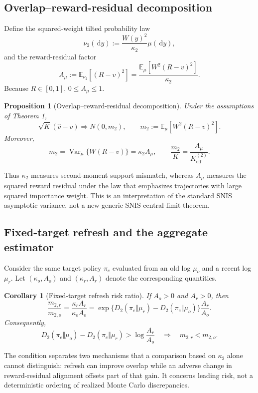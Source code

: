 \documentclass[10pt]{article}
\newtheorem{proposition}{Proposition}
\newtheorem{corollary}{Corollary}
\theoremstyle{remark}
\newcommand{\E}{\mathbb{E}}
\newcommand{\Var}{\operatorname{Var}}
\newcommand{\dd}{\,\mathrm{d}}
\begin{document}
\subsection{Overlap--reward-residual decomposition}
Define the squared-weight tilted probability law
\begin{equation}
\nu_2(\dd y):=\frac{W(y)^2}{\kappa_2}\mu(\dd y),
\end{equation}
and the reward-residual factor
\begin{equation}
A_\mu:=\E_{\nu_2}[(R-v)^2]=\frac{\E_\mu[W^2(R-v)^2]}{\kappa_2}.
\end{equation}
Because $R\in[0,1]$, $0\le A_\mu\le1$.

\begin{proposition}[Overlap--reward-residual decomposition]
Under the assumptions of Theorem 1,
\begin{equation}
\sqrt K(\widehat v-v)\Rightarrow N(0,m_2),\qquad m_2:=\E_\mu[W^2(R-v)^2].
\end{equation}
Moreover,
\begin{equation}
m_2=\Var_\mu\{W(R-v)\}=\kappa_2A_\mu,\qquad \frac{m_2}{K}=\frac{A_\mu}{K_{\mathrm{eff}}^{(2)}}.
\end{equation}
\end{proposition}
Thus $\kappa_2$ measures second-moment support mismatch, whereas $A_\mu$ measures the squared reward residual under the law that emphasizes trajectories with large squared importance weight. This is an interpretation of the standard SNIS asymptotic variance, not a new generic SNIS central-limit theorem.

\subsection{Fixed-target refresh and the aggregate estimator}
Consider the same target policy $\pi_e$ evaluated from an old log $\mu_o$ and a recent log $\mu_r$. Let $(\kappa_o,A_o)$ and $(\kappa_r,A_r)$ denote the corresponding quantities.

\begin{corollary}[Fixed-target refresh risk ratio]
If $A_o>0$ and $A_r>0$, then
\begin{equation}
\frac{m_{2,r}}{m_{2,o}}=\frac{\kappa_rA_r}{\kappa_oA_o}
=\exp\{D_2(\pi_e\Vert\mu_r)-D_2(\pi_e\Vert\mu_o)\}\frac{A_r}{A_o}.
\end{equation}
Consequently,
\begin{equation}
D_2(\pi_e\Vert\mu_o)-D_2(\pi_e\Vert\mu_r)>\log\frac{A_r}{A_o}
\quad\Longrightarrow\quad m_{2,r}<m_{2,o}.
\end{equation}
\end{corollary}
The condition separates two mechanisms that a comparison based on $\kappa_2$ alone cannot distinguish: refresh can improve overlap while an adverse change in reward-residual alignment offsets part of that gain. It concerns leading risk, not a deterministic ordering of realized Monte Carlo discrepancies.
\end{document}
